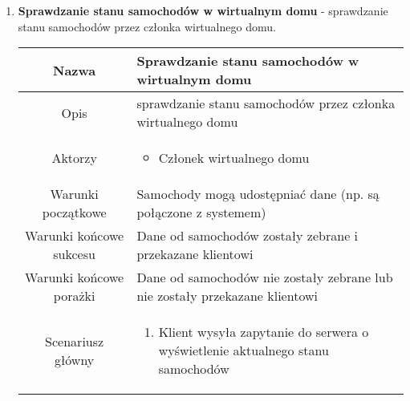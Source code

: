 \documentclass{article}
\begin{document}
\begin{enumerate}
\begin{enumerate}
			\item \textbf{Sprawdzanie stanu samochodów w wirtualnym domu} -
				sprawdzanie stanu samochodów przez członka wirtualnego domu.
				\begin{table}[H]
					\centering
					\begin{tabular}{|c|p{7cm}|}
						\hline
						Nazwa                   & \textbf{Sprawdzanie stanu samochodów w wirtualnym domu}                                                                                                                                                                                          \\
						\hline
						Opis                    & sprawdzanie stanu samochodów przez członka wirtualnego domu                                                                                                                                                                                      \\
						\hline
						Aktorzy                 & \begin{itemize}\item Członek wirtualnego domu\end{itemize}                                                                                                                                                                                       \\
						\hline
						Warunki początkowe      & Samochody mogą udostępniać dane (np. są połączone z systemem)                                                                                                                                                                                    \\
						\hline
						Warunki końcowe sukcesu & Dane od samochodów zostały zebrane i przekazane klientowi                                                                                                                                                                                        \\
						\hline
						Warunki końcowe porażki & Dane od samochodów nie zostały zebrane lub nie zostały przekazane klientowi                                                                                                                                                                      \\
						\hline
						Scenariusz główny       & \begin{enumerate}\item Klient wysyła zapytanie do serwera o wyświetlenie aktualnego stanu samochodów


\end{enumerate}
\end{tabular}
\end{table}
\end{enumerate}
\end{enumerate}
\end{document}
